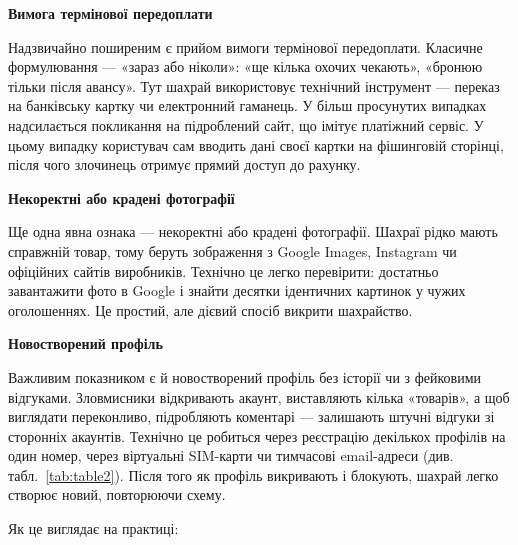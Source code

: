 \vspace{0.3cm}
\noindent\textbf{Вимога термінової передоплати}

Надзвичайно поширеним є прийом вимоги термінової передоплати. Класичне формулювання — «зараз або ніколи»: «ще кілька охочих чекають», «бронюю тільки після авансу». Тут шахрай використовує технічний інструмент — переказ на банківську картку чи електронний гаманець. У більш просунутих випадках надсилається покликання на підроблений сайт, що імітує платіжний сервіс. У цьому випадку користувач сам вводить дані своєї картки на фішинговій сторінці, після чого злочинець отримує прямий доступ до рахунку.

\vspace{0.3cm}

\newpage

\noindent\textbf{Некоректні або крадені фотографії}

Ще одна явна ознака — некоректні або крадені фотографії. Шахраї рідко мають справжній товар, тому беруть зображення з Google Images, Instagram чи офіційних сайтів виробників. Технічно це легко перевірити: достатньо завантажити фото в Google і знайти десятки ідентичних картинок у чужих оголошеннях. Це простий, але дієвий спосіб викрити шахрайство.

\vspace{0.3cm}
\noindent\textbf{Новостворений профіль}

Важливим показником є й новостворений профіль без історії чи з фейковими відгуками. Зловмисники відкривають акаунт, виставляють кілька «товарів», а щоб виглядати переконливо, підробляють коментарі — залишають штучні відгуки зі сторонніх акаунтів. Технічно це робиться через реєстрацію декількох профілів на один номер, через віртуальні SIM-карти чи тимчасові email-адреси (див. табл.~\ref{tab:table2}). Після того як профіль викривають і блокують, шахрай легко створює новий, повторюючи схему.

\newpage

\noindent Як це виглядає на практиці:


